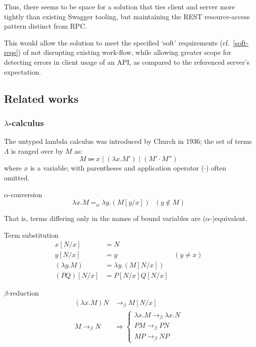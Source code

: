 Thus, there seems to be space for a solution that ties client and server more tightly than existing Swagger tooling, but maintaining the REST resource-access pattern distinct from RPC.

This would allow the solution to meet the specified `soft' requirements (cf.~\ref{soft-reqs}) of not disrupting existing work-flow, while allowing greater scope for detecting errors in client usage of an API, as compared to the referenced server's expectation.

\subsection{Related works}

\subsubsection{$\lambda$-calculus}\label{lambda-calculus}
The untyped lambda calculus was introduced by Church in 1936; the set of terms $\Lambda$ is ranged over by $M$ as: $$
M \Coloneqq x \mid (\lambda{x}.M') \mid (M' \cdot M'')
$$ where $x$ is a variable; with parentheses and application operator ($\cdot$) often omitted. \cite{tsfpl}

\begin{defn}$\alpha$-conversion\label{def:alpha-conversion}
	$$
	\lambda{x}.M =_{\alpha} \lambda{y}.(M[y/x]) \ \ \ (y\notin{M})
	$$
\end{defn}

That is, terms differing only in the names of bound variables are ($\alpha$-)equivalent.

\begin{defn}Term substitution\label{def:term-substitution}
	$$
	\begin{aligned}
		x[N/x] &= N \\
		y[N/x] &= y &(y \neq x) \\
		(\lambda{y}.M) &= \lambda{y}.(M[N/x]) \\
		(PQ)[N/x] &= P[N/x]Q[N/x]
	\end{aligned}
	$$
\end{defn}

\begin{defn}$\beta$-reduction\label{def:beta-conversion}
	$$
	\begin{aligned}
		(\lambda{x}.M)N &\to_{\beta} M[N/x] \\
		M \to_{\beta} N &\Rightarrow \begin{cases}
 			\lambda{x}.M \to_{\beta} \lambda{x}.N \\
 			PM \to_{\beta} PN \\
 			MP \to_{\beta} NP
 		\end{cases}
	\end{aligned}
	$$
\end{defn}

